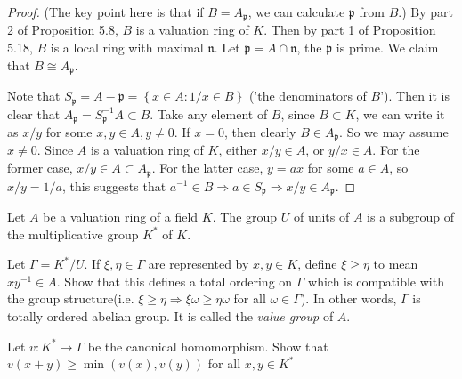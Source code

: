 \documentclass{solution}
\begin{document}
\begin{proof}
    ({\color{red}The key point here is that if $B = A_{\mathfrak{p}}$, we can calculate $\mathfrak{p}$ from $B$.}) By part 2 of Proposition 5.8, $B$ is a valuation ring of $K$. Then by part 1 of Proposition 5.18, $B$ is a local ring with maximal $\mathfrak{n}$. Let $\mathfrak{p} = A \cap \mathfrak{n}$, the $\mathfrak{p}$ is prime. We claim that $B \cong A_{\mathfrak{p}}$.

    Note that $S_\mathfrak{p} = A - \mathfrak{p} = \left\lbrace x \in A: 1 / x \in B \right\rbrace$ ('the denominators of $B$'). Then it is clear that $A_{\mathfrak{p}} = S_{\mathfrak{p}} ^{-1} A \subset B$. Take any element of $B$, since $B \subset K$, we can write it as $x / y$ for some $x, y \in A, y \ne 0$. If $x = 0$, then clearly $B \in A_{\mathfrak{p}}$. So we may assume $x \ne 0$. Since $A$ is a valuation ring of $K$, either $x / y \in A$, or $y / x \in A$. For the former case, $x / y \in A \subset A_{\mathfrak{p}}$. For the latter case, $y = ax$ for some $a \in A$, so $x / y = 1 / a$, this suggests that $a ^{-1} \in B \Rightarrow a \in S_{\mathfrak{p}} \Rightarrow x / y \in A_{\mathfrak{p}}$.
\end{proof}

\begin{problem}
    Let $A$ be a valuation ring of a field $K$. The group $U$ of units of $A$ is a subgroup of the multiplicative group $K^*$ of $K$.

    Let $\Gamma = K^* / U$. If $\xi, \eta \in \Gamma$ are represented by $x, y \in K$, define $\xi \ge \eta$ to mean $x y ^{-1} \in A$. Show that this defines a total ordering on $\Gamma$ which is compatible with the group structure(i.e. $\xi \ge \eta \Rightarrow \xi \omega \ge \eta \omega$ for all $\omega \in \Gamma$). In other words, $\Gamma$ is totally ordered abelian group. It is called the \textit{value group} of $A$.

    Let $v: K^* \rightarrow \Gamma$ be the canonical homomorphism. Show that $v(x + y) \ge \min (v(x), v(y))$ for all $x, y \in K^*$
\end{problem}
\end{document}
